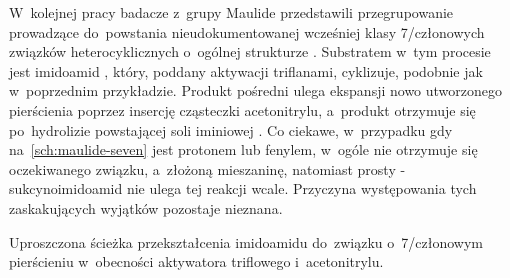 W~kolejnej pracy badacze z~grupy Maulide przedstawili przegrupowanie prowadzące
  do~powstania nieudokumentowanej wcześniej klasy 7\-/członowych związków
  heterocyklicznych o~ogólnej strukturze .
Substratem w~tym procesie jest imidoamid , który,
  poddany aktywacji triflanami, cyklizuje, podobnie jak w~poprzednim przykładzie.
Produkt pośredni  ulega ekspansji nowo utworzonego
  pierścienia poprzez insercję cząsteczki acetonitrylu, a~produkt otrzymuje się
  po~hydrolizie powstającej soli iminiowej .
Co ciekawe, w~przypadku gdy  na~\cref{sch:maulide-seven} jest protonem lub fenylem,
  w~ogóle nie otrzymuje się oczekiwanego związku, a~złożoną mieszaninę,
  natomiast prosty \textalpha-sukcynoimidoamid nie ulega tej reakcji wcale.
Przyczyna występowania tych zaskakujących wyjątków pozostaje nieznana.
\begin{scheme*}
  \centering
  
  \caption{
    Uproszczona ścieżka przekształcenia imidoamidu 
      do~związku  o~7\-/członowym pierścieniu
      w~obecności aktywatora triflowego i~acetonitrylu.
  }
  \label{sch:maulide-seven}
\end{scheme*}

